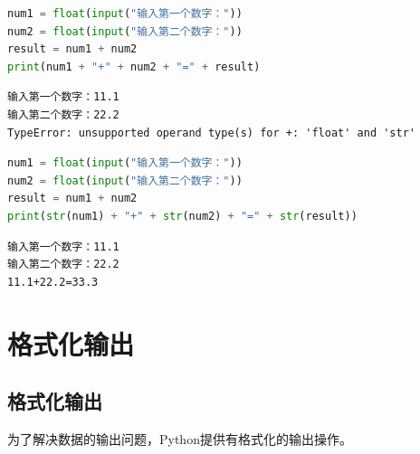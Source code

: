 
\begin{lstlisting}[language=Python]
num1 = float(input("输入第一个数字："))
num2 = float(input("输入第二个数字："))
result = num1 + num2
print(num1 + "+" + num2 + "=" + result)
\end{lstlisting}

\begin{tcolorbox}
	\begin{verbatim}
输入第一个数字：11.1
输入第二个数字：22.2
TypeError: unsupported operand type(s) for +: 'float' and 'str'
	\end{verbatim}
\end{tcolorbox}

\vspace{0.5cm}


\begin{lstlisting}[language=Python]
num1 = float(input("输入第一个数字："))
num2 = float(input("输入第二个数字："))
result = num1 + num2
print(str(num1) + "+" + str(num2) + "=" + str(result))
\end{lstlisting}

\begin{tcolorbox}
	\begin{verbatim}
输入第一个数字：11.1
输入第二个数字：22.2
11.1+22.2=33.3
	\end{verbatim}
\end{tcolorbox}

\newpage

\section{格式化输出}

\subsection{格式化输出}

为了解决数据的输出问题，Python提供有格式化的输出操作。

